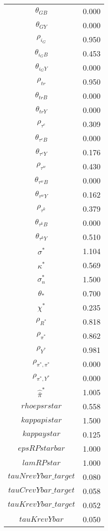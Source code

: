 \begin{center}
\begin{longtable}{cc}
$\theta_{GB}$ 	 & 	 0.000 \\
$\theta_{GY}$ 	 & 	 0.000 \\
$\rho_{i_G}$ 	 & 	 0.950 \\
$\theta_{i_GB}$ 	 & 	 0.453 \\
$\theta_{i_GY}$ 	 & 	 0.000 \\
$\rho_{tr}$ 	 & 	 0.950 \\
$\theta_{trB}$ 	 & 	 0.000 \\
$\theta_{trY}$ 	 & 	 0.000 \\
$\rho_{\tau^c}$ 	 & 	 0.309 \\
$\theta_{\tau^cB}$ 	 & 	 0.000 \\
$\theta_{\tau^cY}$ 	 & 	 0.176 \\
$\rho_{\tau^w}$ 	 & 	 0.430 \\
$\theta_{\tau^wB}$ 	 & 	 0.000 \\
$\theta_{\tau^wY}$ 	 & 	 0.162 \\
$\rho_{\tau^k}$ 	 & 	 0.379 \\
$\theta_{\tau^kB}$ 	 & 	 0.000 \\
$\theta_{\tau^kY}$ 	 & 	 0.510 \\
$\sigma^*$ 	 & 	 1.104 \\
$\kappa^*$ 	 & 	 0.569 \\
$\sigma^*_n$ 	 & 	 1.500 \\
$\theta_*$ 	 & 	 0.700 \\
$\chi^*$ 	 & 	 0.235 \\
${\rho_{R^*}}$ 	 & 	 0.818 \\
${\rho_{\pi^*}}$ 	 & 	 0.862 \\
${\rho_{Y^*}}$ 	 & 	 0.981 \\
${\rho_{\pi^*,\pi^*}}$ 	 & 	 0.000 \\
${\rho_{\pi^*,Y^*}}$ 	 & 	 0.000 \\
$\hat{\bar{\pi}}^*$ 	 & 	 1.005 \\
$rhoepsrstar$ 	 & 	 0.558 \\
$kappapistar$ 	 & 	 1.500 \\
$kappaystar$ 	 & 	 0.125 \\
$epsRPstarbar$ 	 & 	 1.000 \\
$lamRPstar$ 	 & 	 1.000 \\
$tauNrevYbar\_target$ 	 & 	 0.080 \\
$tauCrevYbar\_target$ 	 & 	 0.058 \\
$tauKrevYbar\_target$ 	 & 	 0.052 \\
$tauKrevYbar$ 	 & 	 0.050 \\

\end{longtable}
\end{center}
